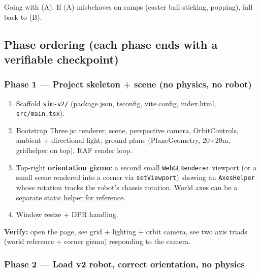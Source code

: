 \documentclass[
]{article}
\providecommand{\tightlist}{%
  \setlength{\itemsep}{0pt}\setlength{\parskip}{0pt}}
\begin{document}
Going with (A). If (A) misbehaves on ramps (caster ball sticking,
popping), fall back to (B).

\subsection{Phase ordering (each phase ends with a verifiable
checkpoint)}\label{phase-ordering-each-phase-ends-with-a-verifiable-checkpoint}

\subsubsection{Phase 1 --- Project skeleton + scene (no physics, no
robot)}\label{phase-1-project-skeleton-scene-no-physics-no-robot}

\begin{enumerate}
\def\labelenumi{\arabic{enumi}.}
\tightlist
\item
  Scaffold \texttt{sim-v2/} (package.json, tsconfig, vite.config,
  index.html, \texttt{src/main.tsx}).
\item
  Bootstrap Three.js: renderer, scene, perspective camera,
  OrbitControls, ambient + directional light, ground plane
  (PlaneGeometry, 20×20m, gridhelper on top), RAF render loop.
\item
  Top-right \textbf{orientation gizmo}: a second small
  \texttt{WebGLRenderer} viewport (or a small scene rendered into a
  corner via \texttt{setViewport}) showing an \texttt{AxesHelper} whose
  rotation tracks the robot's chassis rotation. World axes can be a
  separate static helper for reference.
\item
  Window resize + DPR handling.
\end{enumerate}

\textbf{Verify:} open the page, see grid + lighting + orbit camera, see
two axis triads (world reference + corner gizmo) responding to the
camera.

\subsubsection{Phase 2 --- Load v2 robot, correct orientation, no
physics}\label{phase-2-load-v2-robot-correct-orientation-no-physics}
\end{document}
